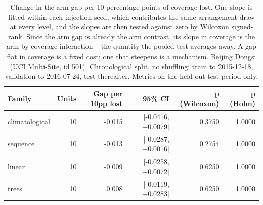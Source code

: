\begin{table}[htbp]
\caption{Change in the arm gap per 10 percentage points of coverage lost. One slope is fitted within each injection seed, which contributes the same arrangement draw at every level, and the slopes are then tested against zero by Wilcoxon signed-rank. Since the arm gap is already the arm contrast, its slope in coverage is the arm-by-coverage interaction -- the quantity the pooled test averages away. A gap flat in coverage is a fixed cost; one that steepens is a mechanism. Beijing Dongsi (UCI Multi-Site, id 501). Chronological split, no shuffling: train to 2015-12-18, validation to 2016-07-24, test thereafter. Metrics on the held-out test period only.}
\label{tab:ablation_dose_response}
\begin{tabular}{lrrrrr}
\toprule
Family & Units & Gap per 10pp lost & 95\% CI & p (Wilcoxon) & p (Holm) \\
\midrule
climatological & 10 & -0.015 & [-0.0416, +0.0079] & 0.3750 & 1.0000 \\
sequence & 10 & -0.013 & [-0.0287, +0.0016] & 0.2754 & 1.0000 \\
linear & 10 & -0.009 & [-0.0258, +0.0072] & 0.6250 & 1.0000 \\
trees & 10 & 0.008 & [-0.0119, +0.0283] & 0.6250 & 1.0000 \\
\bottomrule
\end{tabular}
\end{table}
